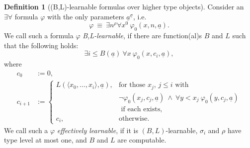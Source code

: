 \documentclass[1p]{elsarticle}
\newcommand{\tup}{\underline} %
\newcommand{\Telse}{\text{otherwise}}
\theoremstyle{plain}
\theoremstyle{definition}
\newtheorem{dfn}[thm]{Definition}
\theoremstyle{remark}
\renewcommand{\phi}{\varphi}
\theoremstyle{definition}
\begin{document}
% 
%
\begin{dfn}[(B,L)-learnable formulas over higher type objects]\label{d:fmcNum}
Consider an $\exists\forall$ formula $\phi$ with the only parameters $\tup a^{\tup \sigma}$, i.e.
\[\phi\ \equiv\ \exists n^\rho \forall x^0\ \phi_0(x,n,\tup a).\]
We call such a formula $\phi$ 
{\em B,L-learnable},
if there are function(al)s $B$ and $L$ such that the following holds:
\[ \exists i\leq B(\tup a)\ \forall x\ \phi_0(x,c_i,\tup a),\] where
\begin{align*}
c_0&:=0,\\
c_{i+1}&:=
\begin{cases}
L(\langle x_0,\ldots,x_i\rangle, \tup a), &\text{for those $x_j$, $j\leq i$ with }\\
 &\neg\phi_0(x_j,c_j,\tup a)\ \wedge\ \forall y<x_j\ \phi_0(y,c_j,\tup a)\\
  &\text{ if each exists},\\
c_i, &\Telse.
\end{cases}
\end{align*}%
We call such a $\phi$ {\em effectively learnable}, if it is $(B,L)$-learnable,
$\sigma_i$ and $\rho$ have type level at most one, and $B$ and $L$ are computable.
\end{dfn}
\newcommand{\seq}{_{(\cdot)}}
\end{document}
